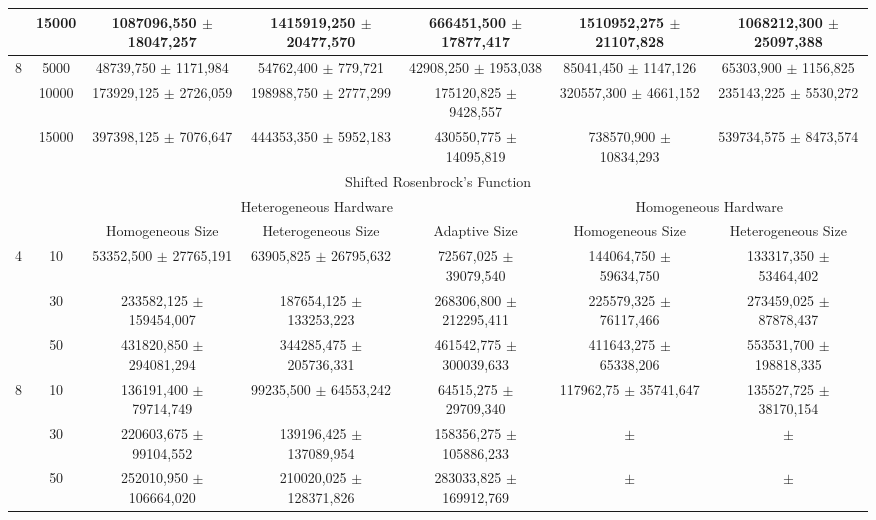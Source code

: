 \documentclass[final,1p,times]{elsarticle}
\begin{document}
\begin{table*}
{\begin{tabular}{|c|c|c|c|c|c|c|}
	&	15000	&	1087096,550	$\pm$	18047,257	&	1415919,250	$\pm$	20477,570	&	666451,500	$\pm$	17877,417	&	1510952,275	$\pm$	21107,828	&	1068212,300	$\pm$	25097,388	\\ \hline
8	&	5000	&	48739,750	$\pm$	1171,984	&	54762,400	$\pm$	779,721		&	42908,250	$\pm$	1953,038	&	85041,450	$\pm$	1147,126	&	65303,900	$\pm$	1156,825	\\ \hline
	&	10000	&	173929,125	$\pm$	2726,059	&	198988,750	$\pm$	2777,299	&	175120,825	$\pm$	9428,557	&	320557,300	$\pm$	4661,152	&	235143,225	$\pm$	5530,272	\\ \hline
	&	15000	&	397398,125	$\pm$	7076,647	&	444353,350	$\pm$	5952,183	&	430550,775	$\pm$	14095,819	&	738570,900	$\pm$	10834,293	&	539734,575	$\pm$	8473,574	\\ \hline
				\multicolumn{7}{|c|}{Shifted Rosenbrock's Function}																							\\ \hline
\multicolumn{2}{|c|}{}	&	\multicolumn{3}{|c|}{Heterogeneous Hardware}												& \multicolumn{2}{|c|}{Homogeneous Hardware}							\\ \hline				
\multicolumn{2}{|c|}{}	&	Homogeneous Size			&	Heterogeneous Size			&	Adaptive Size				& Homogeneous Size				& Heterogeneous Size				\\ \hline
4	&	10	&	53352,500	$\pm$	27765,191	&	63905,825	$\pm$	26795,632	&	72567,025	$\pm$	39079,540	&	144064,750	$\pm$	59634,750	&	133317,350	$\pm$	53464,402	\\ \hline
	&	30	&	233582,125	$\pm$	159454,007	&	187654,125	$\pm$	133253,223	&	268306,800	$\pm$	212295,411	&	225579,325	$\pm$	76117,466	&	273459,025	$\pm$	87878,437	\\ \hline
	&	50	&	431820,850	$\pm$	294081,294	&	344285,475	$\pm$	205736,331	&	461542,775	$\pm$	300039,633	&	411643,275	$\pm$	65338,206	&	553531,700	$\pm$	198818,335	\\ \hline
8	&	10	&	136191,400	$\pm$	79714,749	&	99235,500	$\pm$	64553,242	&	64515,275	$\pm$	29709,340	&	117962,75	$\pm$	35741,647	&	135527,725	$\pm$	38170,154	\\ \hline
	&	30	&	220603,675	$\pm$	99104,552	&	139196,425	$\pm$	137089,954	&	158356,275	$\pm$	105886,233	&		$\pm$		&		$\pm$		\\ \hline
	&	50	&	252010,950	$\pm$	106664,020	&	210020,025	$\pm$	128371,826	&	283033,825	$\pm$	169912,769	&		$\pm$		&		$\pm$		\\ \hline
\end{tabular}
}
\label{tab:resultsTIMEall}
\end{table*}
\end{document}

